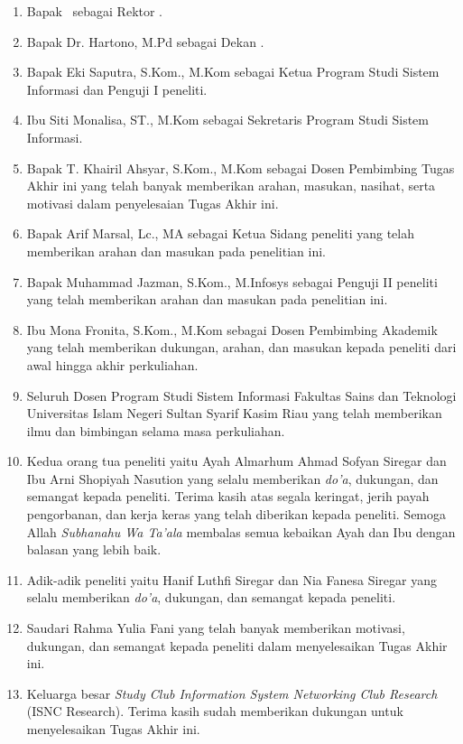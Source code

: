 \begin{enumerate}
	\item Bapak \rektor\ sebagai Rektor \universitas.
	\item Bapak Dr. Hartono, M.Pd sebagai Dekan \fakultas.
	\item Bapak Eki Saputra, S.Kom., M.Kom sebagai Ketua Program Studi Sistem Informasi dan Penguji I peneliti.
	\item Ibu Siti Monalisa, ST., M.Kom sebagai Sekretaris Program Studi Sistem Informasi.
	\item Bapak T. Khairil Ahsyar, S.Kom., M.Kom sebagai Dosen Pembimbing Tugas Akhir ini yang telah banyak memberikan arahan, masukan, nasihat, serta motivasi dalam penyelesaian Tugas Akhir ini.
	\item Bapak Arif Marsal, Lc., MA sebagai Ketua Sidang peneliti yang telah memberikan arahan dan masukan pada penelitian ini.
	\item Bapak Muhammad Jazman, S.Kom., M.Infosys sebagai Penguji II peneliti yang telah memberikan arahan dan masukan pada penelitian ini.
	\item Ibu Mona Fronita, S.Kom., M.Kom sebagai Dosen Pembimbing Akademik yang telah memberikan dukungan, arahan, dan masukan kepada peneliti dari awal hingga akhir perkuliahan.
	\item Seluruh Dosen Program Studi Sistem Informasi Fakultas Sains dan Teknologi Universitas Islam Negeri Sultan Syarif Kasim Riau yang telah memberikan ilmu dan bimbingan selama masa perkuliahan.
	\item Kedua orang tua peneliti yaitu Ayah Almarhum Ahmad Sofyan Siregar dan Ibu Arni Shopiyah Nasution yang selalu memberikan \textit{do'a}, dukungan, dan semangat kepada peneliti. Terima kasih atas segala keringat, jerih payah pengorbanan, dan kerja keras yang telah diberikan kepada peneliti. Semoga Allah \textit{Subhanahu Wa Ta’ala} membalas semua kebaikan Ayah dan Ibu dengan balasan yang lebih baik.
	\item Adik-adik peneliti yaitu Hanif Luthfi Siregar dan Nia Fanesa Siregar yang selalu memberikan \textit{do'a}, dukungan, dan semangat kepada peneliti.
	\item Saudari Rahma Yulia Fani yang telah banyak memberikan motivasi, dukungan, dan semangat kepada peneliti dalam menyelesaikan Tugas Akhir ini.
	\item Keluarga besar \textit{Study Club Information System Networking Club Research} (ISNC Research). Terima kasih sudah memberikan dukungan untuk menyelesaikan Tugas Akhir ini.

\end{enumerate}
